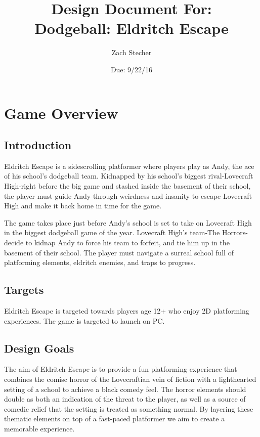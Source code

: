 \documentclass [12pt]{article}
\title{\small{\textbf{Design Document For:}}\\[1in]{\Huge{\textbf{Dodgeball: Eldritch Escape}}}}
\author{Zach Stecher}
\date{Due: 9/22/16}
\begin{document}
\maketitle
\newpage

\section*{Game Overview}

\subsection*{Introduction}

Eldritch Escape is a sidescrolling platformer where players play as Andy, the ace of his school's dodgeball team. Kidnapped by his school's biggest rival-Lovecraft High-right before the big game and stashed inside the basement of their school, the player must guide Andy through weirdness and insanity to escape Lovecraft High and make it back home in time for the game.

The game takes place just before Andy's school is set to take on Lovecraft High in the biggest dodgeball game of the year. Lovecraft High's team-The Horrors-decide to kidnap Andy to force  his team to forfeit, and tie him up in the basement of their school. The player must navigate a surreal school full of platforming elements, eldritch enemies, and traps to progress.

\subsection*{Targets}

Eldritch Escape is targeted towards players age 12+ who enjoy 2D platforming experiences. The game is targeted to launch on PC.

\subsection*{Design Goals}

The aim of Eldritch Escape is to provide a fun platforming experience that combines the comisc horror of the Lovecraftian vein of fiction with a lighthearted setting of a school to achieve a black comedy feel. The horror elements should double as both an indication of the threat to the player, as well as a source of comedic relief that the setting is treated as something normal. By layering these thematic elements on top of a fast-paced platformer we aim to create a memorable experience.
\end{document}
